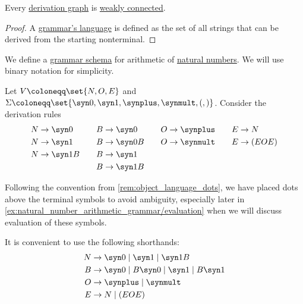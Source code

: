 \begin{proposition}\label{thm:derivation_graph_connected}
  Every \hyperref[def:formal_grammar/graph]{derivation graph} is \hyperref[def:graph_connectedness/weak]{weakly connected}.
\end{proposition}
\begin{proof}
  A \hyperref[def:formal_grammar/language]{grammar's language} is defined as the set of all strings that can be derived from the starting nonterminal.
\end{proof}

\begin{example}\label{ex:natural_number_arithmetic_grammar/schema}
  We define a \hyperref[def:formal_grammar/schema]{grammar schema} for arithmetic of \hyperref[def:natural_numbers]{natural numbers}. We will use binary notation for simplicity.

  Let \( V \coloneqq \set{ N, O, E } \) and \( \Sigma \coloneqq \set{ \syn0, \syn1, \synplus, \synmult, (,) } \). Consider the derivation rules
  \begin{equation}\label{eq:ex:natural_number_arithmetic_grammar/schema/simple}
    \begin{aligned}
      N &\to \syn0   & \quad B &\to \syn0   & \quad O &\to \synplus  & \quad E &\to N       \\
      N &\to \syn1   & \quad B &\to \syn0 B & \quad O &\to \synmult & \quad E &\to (E O E) \\
      N &\to \syn1 B & \quad B &\to \syn1   & \quad   &              &         &            \\
        &            & \quad B &\to \syn1 B & \quad   &              &         &
    \end{aligned}
  \end{equation}

  Following the convention from \cref{rem:object_language_dots}, we have placed dots above the terminal symbols to avoid ambiguity, especially later in \cref{ex:natural_number_arithmetic_grammar/evaluation} when we will discuss evaluation of these symbols.

  It is convenient to use the following shorthands:
  \begin{equation}\label{eq:ex:natural_number_arithmetic_grammar/schema/shorthand}
    \begin{aligned}
      N &\to \syn0 \mid \syn1   \mid \syn1 B \\
      B &\to \syn0 \mid B \syn0 \mid \syn1 \mid B \syn1 \\
      O &\to \synplus \mid \synmult \\
      E &\to N     \mid (E O E)
    \end{aligned}
  \end{equation}


\end{example}

